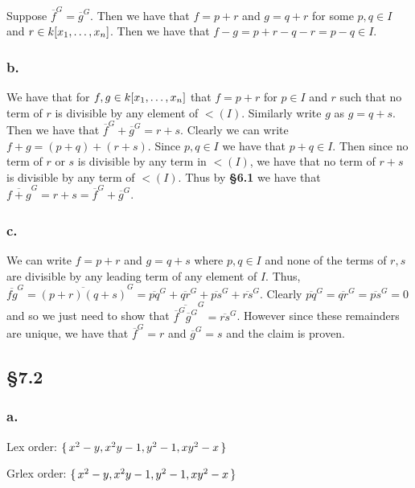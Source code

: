 \documentclass[letterpaper]{article}
\begin{document}
Suppose $\overline{f}^{G} = \overline{g}^{G}$.
Then we have that $f = p + r$ and $g = q + r$ for some $p, q \in I$ and $r \in k\bqty{x_{1}, \ldots, x_{n}}$.
Then we have that $f - g = p + r - q - r = p - q \in I$.

\subsubsection*{b.}

We have that for $f, g \in k\bqty{x_{1}, \ldots, x_{n}}$ that $f = p + r$ for $p \in I$ and $r$ such that no term of $r$ is divisible by any element of $\lt(I)$.
Similarly write $g$ as $g = q + s$.
Then we have that $\overline{f}^{G} + \overline{g}^{G} = r + s$.
Clearly we can write $f + g = (p + q) + (r + s)$.
Since $p, q \in I$ we have that $p + q \in I$.
Then since no term of $r$ or $s$ is divisible by any term in $\lt(I)$, we have that no term of $r + s$ is divisible by any term of $\lt(I)$.
Thus by \textbf{\S 6.1} we have that $\overline{f + g}^{G} = r + s = \overline{f}^{G} + \overline{g}^{G}$.

\subsubsection*{c.}

We can write $f = p + r$ and $g = q + s$ where $p, q \in I$ and none of the terms of $r, s$ are divisible by any leading term of any element of $I$.
Thus, $\overline{fg}^G = \overline{(p + r)(q + s)}^G = \overline{pq}^G + \overline{qr}^G + \overline{ps}^G + \overline{rs}^G$.
Clearly $\overline{pq}^G = \overline{qr}^G = \overline{ps}^G = 0$ and so we just need to show that $ \overline{\overline{f}^G \overline{g}^G}^G = \overline{rs}^G$.
However since these remainders are unique, we have that $\overline{f}^{G} = r$ and $\overline{g}^{G} = s$ and the claim is proven.

\subsection*{\S 7.2}

\subsubsection*{a.}

Lex order: $\set{x^{2} - y, x^{2} y - 1, y^{2} - 1, x y^{2} - x}$

Grlex order: $\set{x^{2} - y, x^{2} y - 1, y^{2} - 1, x y^{2} - x}$
\end{document}
